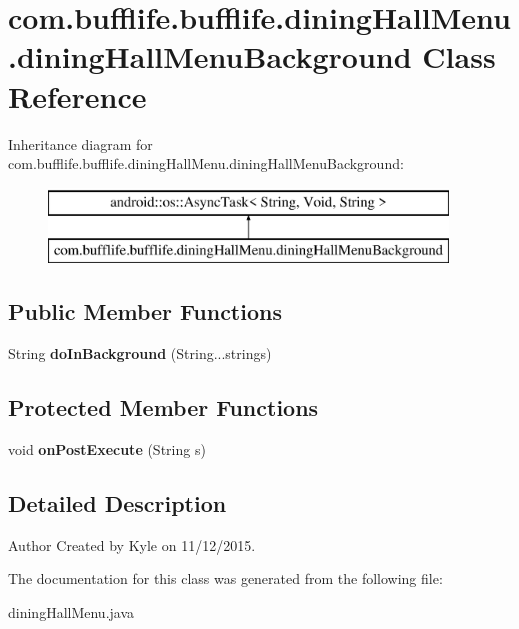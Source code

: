 \hypertarget{classcom_1_1bufflife_1_1bufflife_1_1dining_hall_menu_1_1dining_hall_menu_background}{}\section{com.\+bufflife.\+bufflife.\+dining\+Hall\+Menu.\+dining\+Hall\+Menu\+Background Class Reference}
\label{classcom_1_1bufflife_1_1bufflife_1_1dining_hall_menu_1_1dining_hall_menu_background}
Inheritance diagram for com.\+bufflife.\+bufflife.\+dining\+Hall\+Menu.\+dining\+Hall\+Menu\+Background\+:\begin{figure}[H]
\begin{center}
\leavevmode
\includegraphics[height=2.000000cm]{classcom_1_1bufflife_1_1bufflife_1_1dining_hall_menu_1_1dining_hall_menu_background}
\end{center}
\end{figure}
\subsection*{Public Member Functions}
\begin{DoxyCompactItemize}
\item 
\hypertarget{classcom_1_1bufflife_1_1bufflife_1_1dining_hall_menu_1_1dining_hall_menu_background_a8ca54a70ad2ce79cd4b4bc9f8e69d123}{}String {\bfseries do\+In\+Background} (String...\+strings)\label{classcom_1_1bufflife_1_1bufflife_1_1dining_hall_menu_1_1dining_hall_menu_background_a8ca54a70ad2ce79cd4b4bc9f8e69d123}

\end{DoxyCompactItemize}
\subsection*{Protected Member Functions}
\begin{DoxyCompactItemize}
\item 
\hypertarget{classcom_1_1bufflife_1_1bufflife_1_1dining_hall_menu_1_1dining_hall_menu_background_a5176926158f2f9691b9aff4a2212e502}{}void {\bfseries on\+Post\+Execute} (String s)\label{classcom_1_1bufflife_1_1bufflife_1_1dining_hall_menu_1_1dining_hall_menu_background_a5176926158f2f9691b9aff4a2212e502}

\end{DoxyCompactItemize}


\subsection{Detailed Description}
\begin{DoxyAuthor}{Author}
Created by Kyle on 11/12/2015. 
\end{DoxyAuthor}


The documentation for this class was generated from the following file\+:\begin{DoxyCompactItemize}
\item 
dining\+Hall\+Menu.\+java\end{DoxyCompactItemize}
